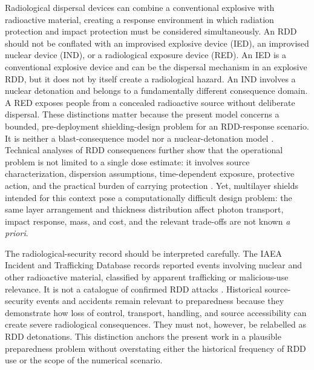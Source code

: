 \documentclass[12pt]{elsarticle}
\begin{document}
	Radiological dispersal devices can combine a conventional explosive with radioactive material, creating a response environment in which radiation protection and impact protection must be considered simultaneously. An RDD should not be conflated with an improvised explosive device (IED), an improvised nuclear device (IND), or a radiological exposure device (RED). An IED is a conventional explosive device and can be the dispersal mechanism in an explosive RDD, but it does not by itself create a radiological hazard. An IND involves a nuclear detonation and belongs to a fundamentally different consequence domain. A RED exposes people from a concealed radioactive source without deliberate dispersal. These distinctions matter because the present model concerns a bounded, pre-deployment shielding-design problem for an RDD-response scenario. It is neither a blast-consequence model nor a nuclear-detonation model \cite{IAEA2006FirstResponders,DHS2025RDD,Shea2004RDD}. Technical analyses of RDD consequences further show that the operational problem is not limited to a single dose estimate: it involves source characterization, dispersion assumptions, time-dependent exposure, protective action, and the practical burden of carrying protection \cite{Harper2007RDD,MusolinoHarper2006,MusolinoEtAl2013,RungeBuddemeier2009,WolbarstEtAl2010,BrambillaEtAl2023}. Yet, multilayer shields intended for this context pose a computationally difficult design problem: the same layer arrangement and thickness distribution affect photon transport, impact response, mass, and cost, and the relevant trade-offs are not known \emph{a priori}.

	The radiological-security record should be interpreted carefully. The IAEA Incident and Trafficking Database records reported events involving nuclear and other radioactive material, classified by apparent trafficking or malicious-use relevance. It is not a catalogue of confirmed RDD attacks \cite{IAEA2024ITDB}. Historical source-security events and accidents remain relevant to preparedness because they demonstrate how loss of control, transport, handling, and source accessibility can create severe radiological consequences. They must not, however, be relabelled as RDD detonations. This distinction anchors the present work in a plausible preparedness problem without overstating either the historical frequency of RDD use or the scope of the numerical scenario.
\end{document}

